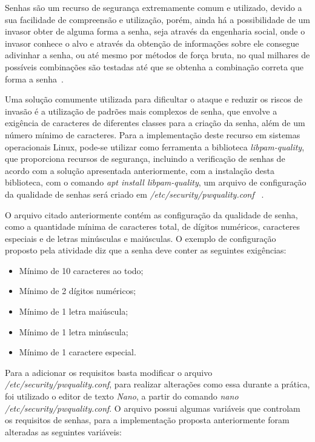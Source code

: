 \documentclass[
	12pt,				%
	oneside,   	        %
	a4paper,			%
	english,			%
	french,				%
	spanish,			%
	brazil,				%
	]{pacotes/abntex2}
\begin{document}
Senhas são um recurso de segurança extremamente comum e utilizado, devido a sua facilidade de compreensão e utilização, porém, ainda há a possibilidade de um invasor obter de alguma forma a senha, seja através da engenharia social, onde o invasor conhece o alvo e através da obtenção de informações sobre ele consegue adivinhar a senha, ou até mesmo por métodos de força bruta, no qual milhares de possíveis combinações são testadas até que se obtenha a combinação correta que forma a senha~\cite{silberschatz2015}.

Uma solução comumente utilizada para dificultar o ataque e reduzir os riscos de invasão é a utilização de padrões mais complexos de senha, que envolve a exigência de caracteres de diferentes classes para a criação da senha, além de um número mínimo de caracteres. Para a implementação deste recurso em sistemas operacionais Linux, pode-se utilizar como ferramenta a biblioteca \textit{libpam-quality}, que proporciona recursos de segurança, incluindo a verificação de senhas de acordo com a solução apresentada anteriormente, com a instalação desta biblioteca, com o comando \textit{apt install libpam-quality}, um arquivo de configuração da qualidade de senhas será criado em \textit{/etc/security/pwquality.conf} ~\cite{libpam-pwquality}.

O arquivo citado anteriormente contém as configuração da qualidade de senha, como a quantidade mínima de caracteres total, de dígitos numéricos, caracteres especiais e de letras minúsculas e maiúsculas. O exemplo de configuração proposto pela atividade diz que a senha deve conter as seguintes exigências:

\begin{itemize}
    \item Mínimo de 10 caracteres ao todo;
    \item Mínimo de 2 dígitos numéricos;
    \item Mínimo de 1 letra maiúscula;
    \item Mínimo de 1 letra minúscula;
    \item Mínimo de 1 caractere especial.
\end{itemize}

Para a adicionar os requisitos basta modificar o arquivo \textit{/etc/security/pwquality.conf}, para realizar alterações como essa durante a prática, foi utilizado o editor de texto \textit{Nano}, a partir do comando \textit{nano /etc/security/pwquality.conf}. O arquivo possui algumas variáveis que controlam os requisitos de senhas, para a implementação proposta anteriormente foram alteradas as seguintes variáveis:
\end{document}
